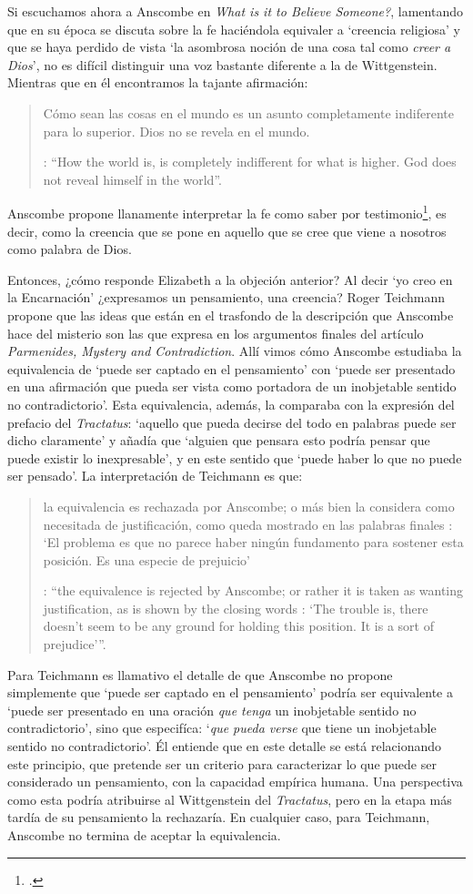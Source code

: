 Si escuchamos ahora a Anscombe en \emph{What is it to Believe Someone?}, lamentando que en su época se discuta sobre la fe haciéndola equivaler a `creencia religiosa' y que se haya perdido de vista \enquote*{la asombrosa noción de una cosa tal como \emph{creer a Dios}}, no es difícil distinguir una voz bastante diferente a la de Wittgenstein. Mientras que en él encontramos la tajante afirmación: \blockquote[{\Cite[\S6.432]{wittgenstein1922tractatus}}: \enquote{How the world is, is completely indifferent for what is higher. God does not reveal himself in the world}.]{Cómo sean las cosas en el mundo es un asunto completamente indiferente para lo superior. Dios no se revela en el mundo.}; Anscombe propone llanamente interpretar la fe como saber por testimonio\footnote{\cite[Cf.][87-88]{conesa1994cc}.}, es decir, como la creencia que se pone en aquello que se cree que viene a nosotros como palabra de Dios.

Entonces, ¿cómo responde Elizabeth a la objeción anterior? Al decir \enquote*{yo creo en la Encarnación} ¿expresamos un pensamiento, una creencia? Roger Teichmann propone que las ideas que están en el trasfondo de la descripción que Anscombe hace del misterio son las que expresa en los argumentos finales del artículo \emph{Parmenides, Mystery and Contradiction}. Allí vimos cómo Anscombe estudiaba la equivalencia de `puede ser captado en el pensamiento' con `puede ser presentado en una afirmación que pueda ser vista como portadora de un inobjetable sentido no contradictorio'. Esta equivalencia, además, la comparaba con la expresión del prefacio del \emph{Tractatus}: `aquello que pueda decirse del todo en palabras puede ser dicho claramente' y añadía que \enquote*{alguien que pensara esto podría pensar que puede existir lo inexpresable}, y en este sentido que \enquote*{puede haber lo que no puede ser pensado}. La interpretación de Teichmann es que: \blockquote[{\Cite[212]{teichmann2008ans}}: \enquote{the equivalence is rejected by Anscombe; or rather it is taken as wanting justification, as is shown by the closing words \textelp{}: `The trouble is, there doesn't seem to be any ground for holding this position. It is a sort of prejudice'}.]{la equivalencia es rechazada por Anscombe; o más bien la considera como necesitada de justificación, como queda mostrado en las palabras finales \textelp{}: `El problema es que no parece haber ningún fundamento para sostener esta posición. Es una especie de prejuicio'}. Para Teichmann es llamativo el detalle de que Anscombe no propone simplemente que \enquote*{puede ser captado en el pensamiento} podría ser equivalente a \enquote*{puede ser presentado en una oración \emph{que tenga} un inobjetable sentido no contradictorio}, sino que especifíca: \enquote*{\emph{que pueda verse} que tiene un inobjetable sentido no contradictorio}. Él entiende que en este detalle se está relacionando este principio, que pretende ser un criterio para caracterizar lo que puede ser considerado un pensamiento, con la capacidad empírica humana. Una perspectiva como esta podría atribuirse al Wittgenstein del \emph{Tractatus}, pero en la etapa más tardía de su pensamiento la rechazaría. En cualquier caso, para Teichmann, Anscombe no termina de aceptar la equivalencia.

